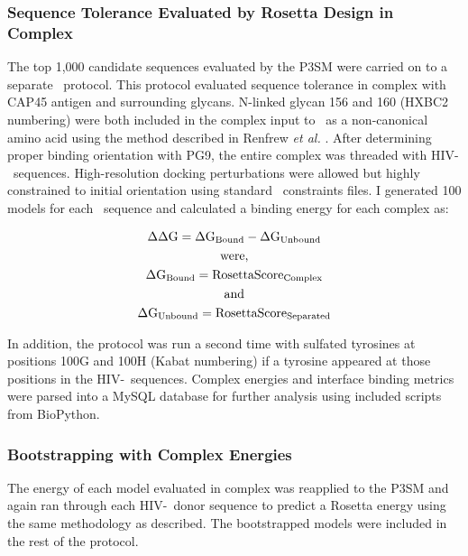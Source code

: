 \subsubsection{Sequence Tolerance Evaluated by Rosetta Design in Complex}
The top 1,000 candidate sequences evaluated by the P3SM were carried on to a separate \rosetta~protocol. This protocol evaluated sequence tolerance in complex with CAP45 antigen and surrounding glycans. N-linked glycan 156 and 160 (HXBC2 numbering) were both included in the complex input to \rosetta~as a non-canonical amino acid using the method described in Renfrew \textit{et al.} \citep{Renfrew:2012ci}. After determining proper binding orientation with PG9, the entire complex was threaded with HIV-\naive~sequences. High-resolution docking perturbations were allowed but highly constrained to initial orientation using standard \rosetta~constraints files. I generated 100 models for each \naive~sequence and calculated a binding energy for each complex as:

\begin{gather*}
    \Delta \Delta \textup{G} = \Delta \textup{G}_{\textup{Bound}} - \Delta \textup{G}_{\textup{Unbound}} \\
    \textup{were,} \\
    \Delta \textup{G}_{\textup{Bound}} = \textup{RosettaScore}_{\textup{Complex}} \\
    \textup{and}\\
    \Delta \textup{G}_{\textup{Unbound}} = \textup{RosettaScore}_{\textup{Separated}}
\end{gather*}

In addition, the protocol was run a second time with sulfated tyrosines at positions 100G and 100H (Kabat numbering) if a tyrosine appeared at those positions in the HIV-\naive~sequences. Complex energies and interface binding metrics were parsed into a MySQL database for further analysis using included scripts from BioPython.

\subsubsection{Bootstrapping with Complex Energies}
The energy of each model evaluated in complex was reapplied to the P3SM and again ran through each HIV-\naive~donor sequence to predict a Rosetta energy using the same methodology as described. The bootstrapped models were included in the rest of the protocol.

